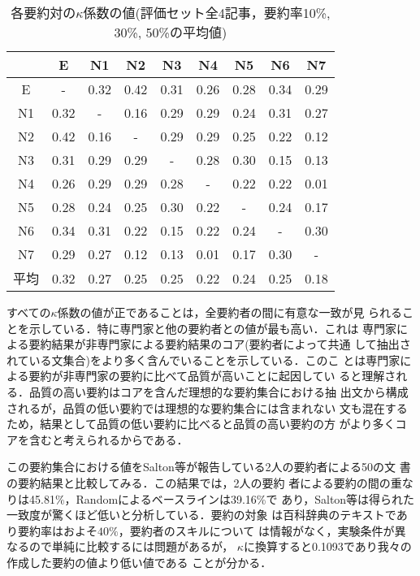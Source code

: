 \begin{table*}
\begin{center}
\caption{各要約対の$\kappa$係数の値(評価セット全4記事，要約率10\%, 30\%, 50\%の平均値)}
{\small
\begin{tabular}{|c||c|c|c|c|c|c|c|c|} \hline
& E & N1 & N2 & N3 & N4 & N5 & N6 & N7 \\ \hline\hline
E&- &0.32 &0.42 &0.31 &0.26 &0.28 &0.34 &0.29 \\ \hline
N1&0.32 &- &0.16 &0.29 &0.29 &0.24 &0.31 &0.27 \\ \hline
N2&0.42 &0.16 &- &0.29 &0.29 &0.25 &0.22 &0.12 \\ \hline
N3&0.31 &0.29 &0.29 &- &0.28 &0.30 &0.15 &0.13 \\ \hline
N4&0.26 &0.29 &0.29 &0.28 &- &0.22 &0.22 &0.01 \\ \hline
N5&0.28 &0.24 &0.25 &0.30 &0.22 &- &0.24 &0.17 \\ \hline
N6&0.34 &0.31 &0.22 &0.15 &0.22 &0.24 &- &0.30 \\ \hline
N7&0.29 &0.27 &0.12 &0.13 &0.01 &0.17 &0.30 &- \\ \hline\hline
平均&0.32&0.27&0.25&0.25&0.22&0.24&0.25&0.18 \\ \hline
\end{tabular}
}
\label{matrix-kappa}
\end{center}
\end{table*}

すべての$\kappa$係数の値が正であることは，全要約者の間に有意な一致が見
られることを示している．特に専門家と他の要約者との値が最も高い．これは
専門家による要約結果が非専門家による要約結果のコア(要約者によって共通
して抽出されている文集合)をより多く含んでいることを示している．このこ
とは専門家による要約が非専門家の要約に比べて品質が高いことに起因してい
ると理解される．品質の高い要約はコアを含んだ理想的な要約集合における抽
出文から構成されるが，品質の低い要約では理想的な要約集合には含まれない
文も混在するため，結果として品質の低い要約に比べると品質の高い要約の方
がより多くコアを含むと考えられるからである．

この要約集合における値をSalton等が報告している2人の要約者による50の文
書の要約結果\cite{G.Salton.97}と比較してみる．この結果では，2人の要約
者による要約の間の重なりは45.81\%，Randomによるベースラインは39.16\%で
あり，Salton等は得られた一致度が驚くほど低いと分析している．要約の対象
は百科辞典のテキストであり要約率はおよそ$40\%$，要約者のスキルについて
は情報がなく，実験条件が異なるので単純に比較するには問題があるが，
$\kappa$に換算すると0.1093であり我々の作成した要約の値より低い値である
ことが分かる．

